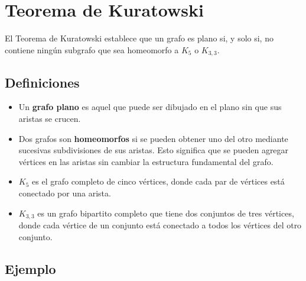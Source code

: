 \documentclass{article}
\begin{document}
\section{Teorema de Kuratowski}
El Teorema de Kuratowski establece que un grafo es plano si, y solo si, no contiene ningún subgrafo que sea homeomorfo a $ K_5 $ o $ K_{3, 3} $. 

\subsection{Definiciones}

\begin{itemize}
    \item Un \textbf{grafo plano} es aquel que puede ser dibujado en el plano sin que sus aristas se crucen.
    \item Dos grafos son \textbf{homeomorfos} si se pueden obtener uno del otro mediante sucesivas subdivisiones de sus aristas. Esto significa que se pueden agregar vértices en las aristas sin cambiar la estructura fundamental del grafo.
    \item $ K_5 $ es el grafo completo de cinco vértices, donde cada par de vértices está conectado por una arista.
    \item $ K_{3, 3} $ es un grafo bipartito completo que tiene dos conjuntos de tres vértices, donde cada vértice de un conjunto está conectado a todos los vértices del otro conjunto.
\end{itemize}

\newpage

\subsection{Ejemplo}

\begin{center}
\end{center}
\end{document}

